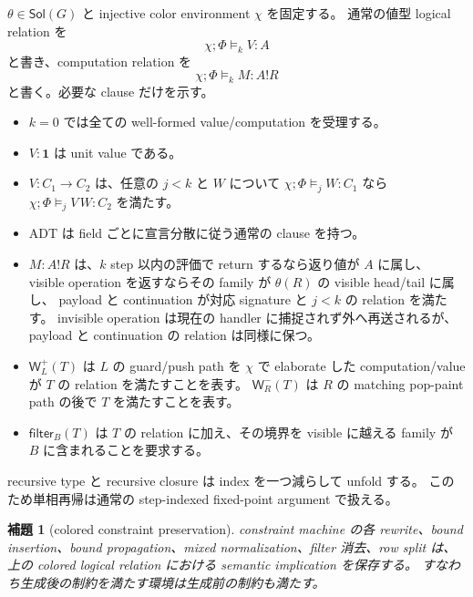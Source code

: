 \documentclass[uplatex,dvipdfmx,a4paper,10.5pt]{jsarticle}
\theoremstyle{jpplain}
\newtheorem{lemma}[definition]{補題}
\newcommand{\Unit}{\mathbf 1}
\newcommand{\Filter}[2]{\mathsf{filter}_{#1}(#2)}
\newcommand{\PWeight}[2]{\mathsf{W}^{+}_{#1}(#2)}
\newcommand{\NWeight}[2]{\mathsf{W}^{-}_{#1}(#2)}
\newcommand{\comp}{\mathbin{!}}
\newcommand{\sol}{\mathsf{Sol}}
\begin{document}
$\theta\in\sol(G)$ と injective color environment $\chi$ を固定する。
通常の値型 logical relation を
\[
  \chi;\Phi\models_k V:A
\]
と書き、computation relation を
\[
  \chi;\Phi\models_k M:A\comp R
\]
と書く。必要な clause だけを示す。

\begin{itemize}
  \item $k=0$ では全ての well-formed value/computation を受理する。
  \item $V:\Unit$ は unit value である。
  \item $V:C_1\to C_2$ は、任意の $j<k$ と $W$ について
        $\chi;\Phi\models_j W:C_1$ なら
        $\chi;\Phi\models_j V\,W:C_2$ を満たす。
  \item ADT は field ごとに宣言分散に従う通常の clause を持つ。
  \item $M:A\comp R$ は、$k$ step 以内の評価で return するなら返り値が $A$ に属し、
        visible operation を返すならその family が $\theta(R)$ の visible head/tail に属し、
        payload と continuation が対応 signature と $j<k$ の relation を満たす。
        invisible operation は現在の handler に捕捉されず外へ再送されるが、payload と continuation の relation は同様に保つ。
  \item $\PWeight{L}{T}$ は $L$ の guard/push path を $\chi$ で elaborate した computation/valueが $T$ の relation を満たすことを表す。
        $\NWeight{R}{T}$ は $R$ の matching pop-paint path の後で $T$ を満たすことを表す。
  \item $\Filter{B}{T}$ は $T$ の relation に加え、その境界を visible に越える family が $B$ に含まれることを要求する。
\end{itemize}

recursive type と recursive closure は index を一つ減らして unfold する。
このため単相再帰は通常の step-indexed fixed-point argument で扱える。

\begin{lemma}[colored constraint preservation]\label{lem:colored-constraint-preservation}
constraint machine の各 rewrite、bound insertion、bound propagation、mixed normalization、filter 消去、row split は、
上の colored logical relation における semantic implication を保存する。
すなわち生成後の制約を満たす環境は生成前の制約も満たす。
\end{lemma}
\end{document}
